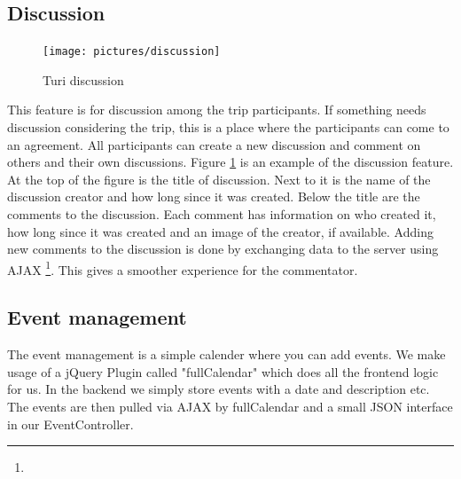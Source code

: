 \documentclass[a4paper]{article}
\begin{document}
\subsection{Discussion}

\begin{figure}[!h]
  \begin{center}
    \vspace{-0pt}
    \texttt{[image: pictures/discussion]}
  \end{center}
\caption{Turi discussion}
\label{fig:discussion}
\end{figure}

This feature is for discussion among the trip participants. If something needs discussion considering the trip, this is a place where the participants can come to an agreement. All participants can create a new discussion and comment on others and their own discussions. Figure \ref{fig:discussion} is an example of the discussion feature. At the top of the figure is the title of discussion. Next to it is the name of the discussion creator and how long since it was created. Below the title are the comments to the discussion. Each comment has information on who created it, how long since it was created and an image of the creator, if available. Adding new comments to the discussion is done by exchanging data to the server using AJAX \footnote{\AJAX}. This gives a smoother experience for the commentator. 

\subsection{Event management}
The event management is a simple calender where you can add events. We make usage of a jQuery Plugin called "fullCalendar" which does all the frontend logic for us. In the backend we simply store events with a date and description etc. The events are then pulled via AJAX by fullCalendar and a small JSON interface in our EventController.
\end{document}
